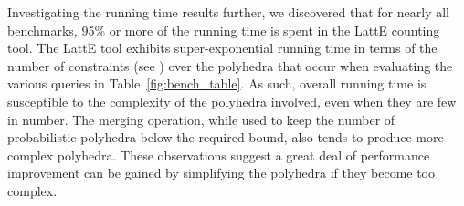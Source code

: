 Investigating the running time results further, we discovered that for
nearly all benchmarks, 95\% or more of the running time is spent in
the LattE counting tool.  The LattE tool exhibits super-exponential
running time in terms of the number of constraints (see
) over the polyhedra that occur when evaluating
the various queries in Table~\ref{fig:bench_table}. As such, overall
running time is susceptible to the complexity of the polyhedra
involved, even when they are few in number. The merging operation,
while used to keep the number of probabilistic polyhedra below the
required bound, also tends to produce more complex polyhedra. These
observations suggest a great deal of performance improvement can be
gained by simplifying the polyhedra if they become too complex.

\fi


